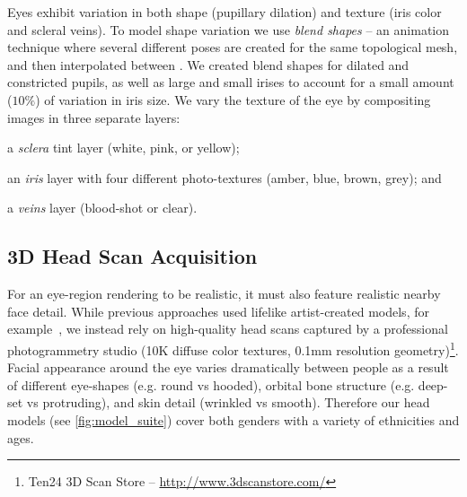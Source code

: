 Eyes exhibit variation in both shape (pupillary dilation) and texture (iris color and scleral veins).
To model shape variation we use \emph{blend shapes} -- an animation technique where several different poses are created for the same topological mesh, and then interpolated between \cite{orvalho2012facial}. 
We created blend shapes for dilated and constricted pupils, as well as large and small irises to account for a small amount ($10\%$) of variation in iris size.
We vary the texture of the eye by compositing images in three separate layers:
\begin{inparaenum}
\item a \emph{sclera} tint layer (white, pink, or yellow);
\item an \emph{iris} layer with four different photo-textures (amber, blue, brown, grey); and
\item a \emph{veins} layer (blood-shot or clear).
\end{inparaenum}

\subsection{3D Head Scan Acquisition}
\label{sec:eye_region_geom_prep}

For an eye-region rendering to be realistic, it must also feature realistic nearby face detail.
While previous approaches used lifelike artist-created models, for example~\cite{swirski2014rendering}, we instead rely on high-quality head scans captured by a professional photogrammetry studio (10K diffuse color textures, 0.1mm resolution geometry)\footnote{Ten24 3D Scan Store -- \url{http://www.3dscanstore.com/}}.
Facial appearance around the eye varies dramatically between people as a result of different eye-shapes (e.g. round vs hooded), orbital bone structure (e.g. deep-set vs protruding), and skin detail (wrinkled vs smooth). Therefore our head models (see \autoref{fig:model_suite}) cover both genders with a variety of ethnicities and ages.


